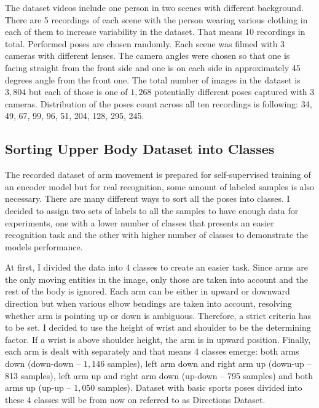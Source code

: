 The dataset videos include one person in two scenes with different background. There are 5 recordings of each scene with the person wearing various clothing in each of them to increase variability in the dataset. That means 10 recordings in total. Performed poses are chosen randomly. Each scene was filmed with 3 cameras with different lenses. The camera angles were chosen so that one is facing straight from the front side and one is on each side in approximately 45 degrees angle from the front one. The total number of images in the dataset is $3{,}804$ but each of those is one of $1{,}268$ potentially different poses captured with 3 cameras. Distribution of the poses count across all ten recordings is following: 34, 49, 67, 99, 96, 51, 204, 128, 295, 245.

\subsection{\label{sec:dataset-labels}Sorting Upper Body Dataset into Classes}

The recorded dataset of arm movement is prepared for self-supervised training of an encoder model but for real recognition, some amount of labeled samples is also necessary. There are many different ways to sort all the poses into classes. I decided to assign two sets of labels to all the samples to have enough data for experiments, one with a lower number of classes that presents an easier recognition task and the other with higher number of classes to demonstrate the models performance.

At first, I divided the data into 4 classes to create an easier task. Since arms are the only moving entities in the image, only those are taken into account and the rest of the body is ignored. Each arm can be either in upward or downward direction but when various elbow bendings are taken into account, resolving whether arm is pointing up or down is ambiguous. Therefore, a strict criteria has to be set. I decided to use the height of wrist and shoulder to be the determining factor. If a wrist is above shoulder height, the arm is in upward position. Finally, each arm is dealt with separately and that means 4 classes emerge: both arms down (down-down -- $1{,}146$ samples), left arm down and right arm up (down-up -- 813 samples), left arm up and right arm down (up-down -- 795 samples) and both arms up (up-up -- $1{,}050$ samples). Dataset with basic sports poses divided into these 4 classes will be from now on referred to as Directions Dataset.

